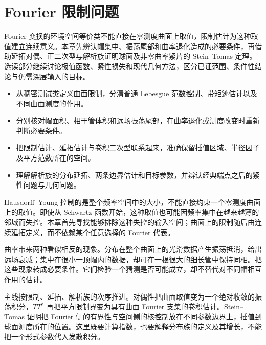 \chapter{Fourier 限制问题}
\label{b2:ch:23}
\begin{chapterabstract}
Fourier 变换的环境空间等价类不能直接在零测度曲面上取值，限制估计为这种取值建立连续意义。本章先辨认帽集中、振荡尾部和曲率退化造成的必要条件，再借助延拓对偶、正二次型与解析族证明球面及非零曲率紧片的 Stein--Tomas 定理。选读部分继续讨论极值函数、紧性损失和现代几何方法，区分已证范围、条件性结论与仍需深层输入的目标。
\end{chapterabstract}

\begin{learninggoals}\begin{itemize}
\item\label{b2:item:23-goal-1}从稠密测试类定义曲面限制，分清普通 Lebesgue 范数控制、带矩迹估计以及不同曲面测度的作用。
\item\label{b2:item:23-goal-2}分别核对帽面积、相干管体积和远场振荡尾部，在曲率退化或测度改变时重新判断必要条件。
\item\label{b2:item:23-goal-3}把限制估计、延拓估计与卷积二次型联系起来，准确保留插值区域、半径因子及平方范数所在的空间。
\item\label{b2:item:23-goal-4}理解解析族的分布延拓、两条边界估计和目标参数，并辨认经典端点之后的紧性问题与几何问题。
\end{itemize}\end{learninggoals}

Hausdorff--Young 控制的是整个频率空间中的大小，不能直接约束一个零测度曲面上的取值。即使从 Schwartz 函数开始，这种取值也可能因频率集中在越来越薄的邻域而失控。本章首先寻找能够排除这种失控的输入空间；曲面上的限制随后由连续延拓定义，而不依赖某个任意选择的 Fourier 代表。

\ProseParagraphBreak

曲率带来两种看似相反的现象。分布在整个曲面上的光滑数据产生振荡抵消，给出远场衰减；集中在很小一顶帽内的数据，却可在一根很大的细长管中保持同相。把这些现象转成必要条件。它们检验一个猜测是否可能成立，却不替代对不同帽相互作用的估计。

\ProseParagraphBreak

主线按限制、延拓、解析族的次序推进。对偶性把曲面取值变为一个绝对收敛的振荡积分，\(TT^*\) 再把平方限制界变为具有曲面 Fourier 支集的卷积估计。Stein--Tomas 证明把 Fourier 侧的有界性与空间侧的核控制放在不同参数边界上，插值到球面测度所在的位置。这里既要计算指数，也要解释分布族的定义及其增长，不能把一个形式参数代入发散积分。

